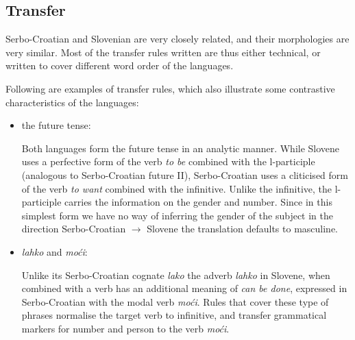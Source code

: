 
\subsection{Transfer}

Serbo-Croatian and Slovenian are very closely related, and their
morphologies are very similar. Most of the transfer rules written
are thus either technical, or written to cover different word order of
the languages.

Following are examples of transfer rules, which also illustrate some
contrastive characteristics of the languages:

\begin{itemize}
\item the future tense:

Both languages form the future tense in an analytic manner. While Slovene
uses a perfective form of the verb \emph{to be} combined with the l-participle (analogous
to Serbo-Croatian future II), Serbo-Croatian uses a cliticised form of the verb \emph{to
  want} combined with the infinitive. Unlike the infinitive, the
l-participle carries the information on the gender and number. Since
in this simplest form we have no way of inferring the gender of the
subject in the direction Serbo-Croatian $\rightarrow$ Slovene the translation defaults
to masculine.

\item \emph{lahko} and \emph{moći}:

Unlike its Serbo-Croatian cognate \emph{lako} the adverb \emph{lahko} in
Slovene, when combined with a verb has an additional meaning of \emph{can be
  done}, expressed in Serbo-Croatian with the modal verb \emph{moći}. Rules that
cover these type of phrases normalise the target verb to infinitive,
and transfer grammatical markers for number and person to the verb \emph{moći}.


\end{itemize}
